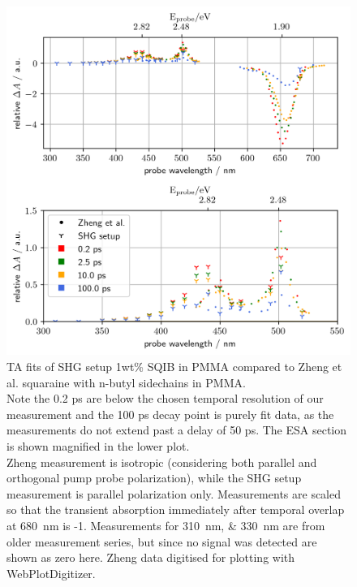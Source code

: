 \documentclass[twoside,openright,listof=numbered]{scrreprt}
\begin{document}
\begin{figure}[hbtp]
\centering
\includegraphics[scale=1]{images/TimeResolvedWavScanvsZheng_Combined.png}
\caption[TA fits of SHG setup 1wt\% SQIB in PMMA compared to Zheng et al.\protect\cite{Zheng2020} squaraine with n-butyl sidechains in PMMA.]{TA fits of SHG setup 1wt\% SQIB in PMMA compared to Zheng et al.\protect\cite{Zheng2020} squaraine with n-butyl sidechains in PMMA.\\ Note the 0.2 ps are below the chosen temporal resolution of our measurement and the 100 ps decay point is purely fit data, as the measurements do not extend past a delay of 50 ps. The ESA section is shown magnified in the lower plot.\\
Zheng measurement is isotropic (considering both parallel and orthogonal pump probe polarization), while the SHG setup measurement is parallel polarization only. Measurements are scaled so that the transient absorption immediately after temporal overlap at \SI{680}{\nano\meter} is -1. Measurements for \SIlist{310;330}{\nano\meter} are from older measurement series, but since no signal was detected are shown as zero here. Zheng data digitised for plotting with WebPlotDigitizer.\cite{Rohatgi2022}\label{fig:TA_vsZheng}}
\end{figure}
\end{document}
